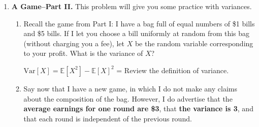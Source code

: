 \documentclass[11pt,preview]{standalone} %
\newcommand{\E}{\mathbb{E}}
\newcommand{\Var}{\text{Var}}
\begin{document}
\begin{enumerate}
\begin{enumerate}
\begin{Freeform}{0}
$\E[X + Y - 18]$ = 
\Hint Review the definition of expectation and linearity of expectation.
\end{Freeform}
\item Given the pay scheme above (\$2.50 to draw from the first bag, \$15.50 to draw from the second bag) Which of the following actions gives the maximum expected profit?
\begin{Multi}
\begin{enumerate}
\TrueChoice \item Drawing from the first bag only.
\FalseChoice \item Drawing from the second bag only.
\FalseChoice \item Drawing from both bags.
\FalseChoice \item Drawing from neither bag.
\end{enumerate}
\end{Multi}
\item As the designer of this game, I want your expected profit to be net negative. I have told you that the proportions of \$1 and \$5 bills in the bag are the same. However, I could lie to you and rig the game so that if I charge you \$2.50, your expected profit for drawing from the first bag is negative. What percentage of bills in the bag should be \$1 bils in order to make your expected profit $-\$1$ (round up to the nearest percent)?
\begin{Freeform}{88}
\% of \$1s? = 
\Hint Review the definition of expectation.
\end{Freeform}
\end{enumerate}


\item {\bf A Game--Part II.} This problem will give you some practice with variances. 
\begin{enumerate}
\item Recall the game from Part I: I have a bag full of equal numbers of \$1 bills and \$5 bills. If I let you choose a bill uniformly at random from this bag (without charging you a fee), let $X$ be the random variable corresponding to your profit. What is the variance of $X$?
\begin{Freeform}{4}
$\Var[X] = \E[X^2] - \E[X]^2$ = 
\Hint Review the definition of variance.
\end{Freeform}
\item Say now that I have a new game, in which I do not make any claims about the composition of the bag. However, I do advertise that the {\bf average earnings for one round are \$3}, that {\bf the variance is 3}, and that each round is independent of the previous round. 


\end{enumerate}
\end{enumerate}
\end{document}
